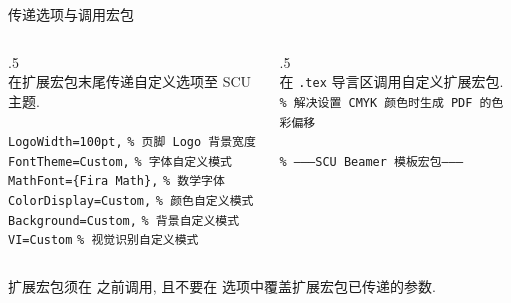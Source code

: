 \begin{frame}{传递选项与调用宏包}\label{frame:PassOpts}
  \begin{columns}[T, onlytextwidth]
    \begin{column}{.5\textwidth}
      \\[.5ex]
      在扩展宏包末尾传递自定义选项至 SCU 主题.\\[1ex]

      \cmd{\%}\\
      \hspace*{1em}\texttt{LogoWidth=100pt,} \texttt{\% 页脚 Logo 背景宽度}\\
      \hspace*{1em}\texttt{FontTheme=Custom,} \texttt{\% 字体自定义模式}\\
      \hspace*{1em}\texttt{MathFont=\{Fira Math\},} \texttt{\% 数学字体}\\
      \hspace*{1em}\texttt{ColorDisplay=Custom,} \texttt{\% 颜色自定义模式}\\
      \hspace*{1em}\texttt{Background=Custom,} \texttt{\% 背景自定义模式}\\
      \hspace*{1em}\texttt{VI=Custom} \texttt{\% 视觉识别自定义模式}\\
    \end{column}
    \begin{column}{.5\textwidth}
      \\[.5ex]
      在 \texttt{.tex} 导言区调用自定义扩展宏包.\\[1ex]

      \texttt{\% 解决设置 CMYK 颜色时生成 PDF 的色彩偏移}\\
      \\[.5ex]
      \texttt{\% --------SCU Beamer 模板宏包--------}\\
      \\
      \\[1ex]
    \end{column}\bigskip
  \end{columns}
  扩展宏包须在  之前调用, 且不要在  选项中覆盖扩展宏包已传递的参数.
\end{frame}

